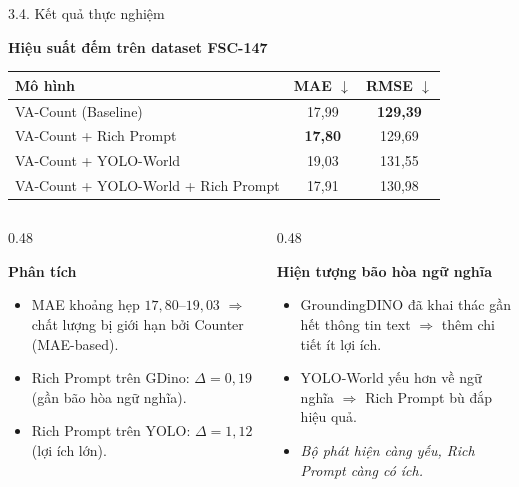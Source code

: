 \documentclass[11pt]{beamer}
\begin{document}
\begin{frame}{3.4. Kết quả thực nghiệm}
\scriptsize

\textbf{Hiệu suất đếm trên dataset FSC-147}

\centering
\renewcommand{\arraystretch}{1.3}
\begin{tabular}{|l|c|c|}
\hline
\rowcolor{uitblue!15}
\textbf{Mô hình} & \textbf{MAE} $\downarrow$ & \textbf{RMSE} $\downarrow$ \\
\hline
VA-Count (Baseline) & 17,99 & \textbf{129,39} \\
\hline
VA-Count + Rich Prompt & \textbf{17,80} & 129,69 \\
\hline
VA-Count + YOLO-World & 19,03 & 131,55 \\
\hline
\rowcolor{orange!10} VA-Count + YOLO-World + Rich Prompt & 17,91 & 130,98 \\
\hline
\end{tabular}

\vspace{0.5em}

\begin{columns}[T]
\begin{column}{0.48\textwidth}
\begin{block}{\textbf{Phân tích}}
\begin{itemize}
  \item MAE khoảng hẹp $17{,}80$--$19{,}03$ $\Rightarrow$ chất lượng bị giới hạn bởi Counter (MAE-based).
  \item Rich Prompt trên GDino: $\Delta = 0{,}19$ (gần bão hòa ngữ nghĩa).
  \item Rich Prompt trên YOLO: $\Delta = 1{,}12$ (lợi ích lớn).
\end{itemize}
\end{block}
\end{column}

\begin{column}{0.48\textwidth}
\begin{block}{\textbf{Hiện tượng bão hòa ngữ nghĩa}}
\begin{itemize}
  \item GroundingDINO đã khai thác gần hết thông tin text $\Rightarrow$ thêm chi tiết ít lợi ích.
  \item YOLO-World yếu hơn về ngữ nghĩa $\Rightarrow$ Rich Prompt bù đắp hiệu quả.
  \item \emph{Bộ phát hiện càng yếu, Rich Prompt càng có ích.}
\end{itemize}
\end{block}
\end{column}
\end{columns}

\end{frame}
\end{document}
